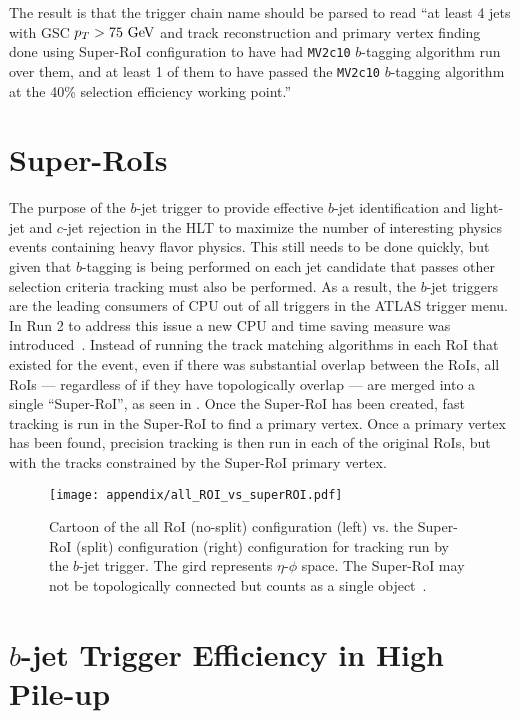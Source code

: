 The result is that the trigger chain name should be parsed to read ``at least 4 jets with GSC $p_{T} > 75~\mathrm{GeV}$ and track reconstruction and primary vertex finding done using Super-RoI configuration to have had \texttt{MV2c10} $b$-tagging algorithm run over them, and at least 1 of them to have passed the \texttt{MV2c10} $b$-tagging algorithm at the 40\% selection efficiency working point.''


\section{Super-RoIs}\label{section:super-RoI}

The purpose of the $b$-jet trigger to provide effective $b$-jet identification and light-jet and $c$-jet rejection in the \gls{HLT} to maximize the number of interesting physics events containing heavy flavor physics.
This still needs to be done quickly, but given that $b$-tagging is being performed on each jet candidate that passes other selection criteria tracking must also be performed.
As a result, the $b$-jet triggers are the leading consumers of CPU out of all triggers in the ATLAS trigger menu.
In Run 2 to address this issue a new CPU and time saving measure was introduced~\cite{Hetherly:2313140}.
Instead of running the track matching algorithms in each \gls{RoI} that existed for the event, even if there was substantial overlap between the RoIs, all RoIs --- regardless of if they have topologically overlap --- are merged into a single ``Super-RoI'', as seen in .
Once the Super-RoI has been created, fast tracking is run in the Super-RoI to find a primary vertex.
Once a primary vertex has been found, precision tracking is then run in each of the original RoIs, but with the tracks constrained by the Super-RoI primary vertex.

\begin{figure}[htbp]
 \centering
 \texttt{[image: appendix/all\_ROI\_vs\_superROI.pdf]}
 \caption[Cartoon of the all RoI vs. the Super-RoI configuration for tracking run by the $b$-jet trigger.]{%
  Cartoon of the all RoI (no-split) configuration (left) vs. the Super-RoI (split) configuration (right) configuration for tracking run by the $b$-jet trigger.
  The gird represents $\eta$-$\phi$ space.
  The Super-RoI may not be topologically connected but counts as a single object~\cite{Hetherly:2313140}.}
 \label{fig:all_ROI_vs_superROI}
\end{figure}

\section{$b$-jet Trigger Efficiency in High Pile-up}\label{section:BJetTrig_efficiency}

